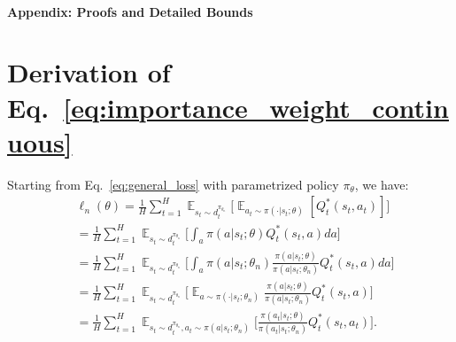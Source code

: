 \documentclass{article}
\begin{document}
\vspace{-5pt}





{\small


}

\newpage
\onecolumn
\appendix
\paragraph{Appendix: Proofs and Detailed Bounds}

\section{Derivation of Eq.~\ref{eq:importance_weight_continuous}}
\label{sec:importance_weight}
Starting from Eq.~\ref{eq:general_loss} with parametrized policy $\pi_{\theta}$, we have:
\begin{align}
&\ell_n(\theta) = \frac{1}{H}\sum_{t=1}^H\mathop\mathbb{E}_{s_t\sim d_t^{\pi_{\theta_n}}}\big[ \mathop\mathbb{E}_{a_t\sim\pi(\cdot|s_t;\theta)}[Q_t^*(s_t,a_t)]  \big] \nonumber\\
& = \frac{1}{H}\sum_{t=1}^H\mathop\mathbb{E}_{s_t\sim d_t^{\pi_{\theta_n}}}\big[\int_{a}\pi(a|s_t;\theta)Q_t^*(s_t,a)da  \big] \nonumber\\
& = \frac{1}{H}\sum_{t=1}^H\mathop\mathbb{E}_{s_t\sim d_t^{\pi_{\theta_n}}}\big[\int_{a}\pi(a|s_t;\theta_n)\frac{\pi(a|s_t;\theta)}{\pi(a|s_t;\theta_n)}Q_t^*(s_t,a) da\big] \nonumber\\
& = \frac{1}{H}\sum_{t=1}^H\mathop\mathbb{E}_{s_t\sim d_t^{\pi_{\theta_n}}}\big[\mathop\mathbb{E}_{a\sim\pi(\cdot|s_t;\theta_n)}  \frac{\pi(a|s_t;\theta)}{\pi(a|s_t;\theta_n)}Q_t^*(s_t,a)\big] \nonumber\\
& = \frac{1}{H}\sum_{t=1}^H \mathop\mathbb{E}_{s_t\sim d_t^{\pi_{\theta_n}},a_t\sim \pi(a|s_t;\theta_n)} \Big[\frac{\pi(a_t|s_t;\theta)}{\pi(a_t|s_t;\theta_n)}Q_t^*(s_t,a_t)\Big].
\end{align}
\end{document}
